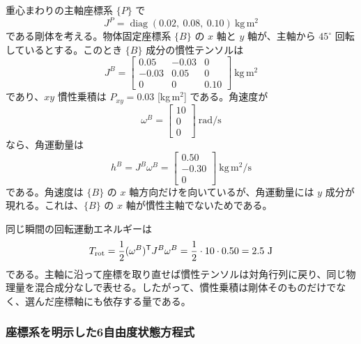 \begin{example}[主軸からずれた座標系での角運動量と回転エネルギー]
重心まわりの主軸座標系 $\{P\}$ で
\begin{equation}
  J^P=\operatorname{diag}(0.02,\ 0.08,\ 0.10)\ \mathrm{kg\,m^2}
\end{equation}
である剛体を考える。物体固定座標系 $\{B\}$ の $x$ 軸と $y$ 軸が、主軸から $45^\circ$ 回転しているとする。このとき $\{B\}$ 成分の慣性テンソルは
\begin{equation}
  J^B=
  \begin{bmatrix}
    0.05&-0.03&0\\
    -0.03&0.05&0\\
    0&0&0.10
  \end{bmatrix}
  \ \mathrm{kg\,m^2}
\end{equation}
であり、$xy$ 慣性乗積は $P_{xy}=0.03$ [kg\,m$^2$] である。角速度が
\begin{equation}
  \omega^B=
  \begin{bmatrix}
    10\\0\\0
  \end{bmatrix}
  \ \mathrm{rad/s}
\end{equation}
なら、角運動量は
\begin{equation}
  h^B=J^B\omega^B
  =
  \begin{bmatrix}
    0.50\\-0.30\\0
  \end{bmatrix}
  \ \mathrm{kg\,m^2/s}
\end{equation}
である。角速度は $\{B\}$ の $x$ 軸方向だけを向いているが、角運動量には $y$ 成分が現れる。これは、$\{B\}$ の $x$ 軸が慣性主軸でないためである。

同じ瞬間の回転運動エネルギーは
\begin{equation}
  T_\mathrm{rot}
  =
  \frac{1}{2}(\omega^B)^{\mathsf{T}} J^B\omega^B
  =
  \frac{1}{2}\cdot 10\cdot0.50
  =
  2.5\ \mathrm{J}
\end{equation}
である。主軸に沿って座標を取り直せば慣性テンソルは対角行列に戻り、同じ物理量を混合成分なしで表せる。したがって、慣性乗積は剛体そのものだけでなく、選んだ座標軸にも依存する量である。
\end{example}

\subsubsection{座標系を明示した6自由度状態方程式}

